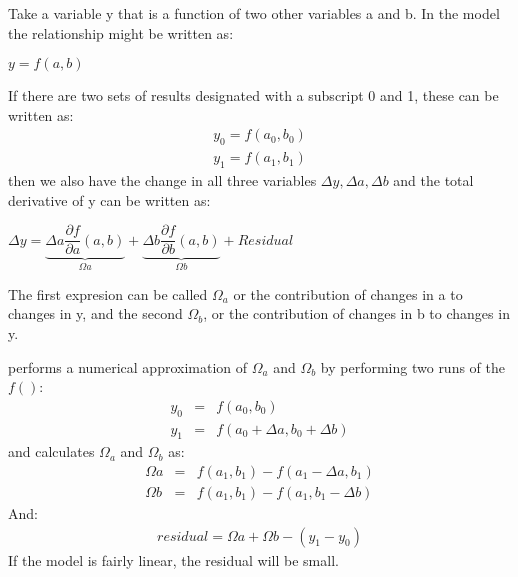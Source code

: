 \documentclass[letterpaper,10pt,english]{jupyterBook}
\begin{document}
\sphinxAtStartPar
Take a variable y that is a function of two other variables a and b.  In the model the relationship might be written as:

\sphinxAtStartPar
\(y = f(a,b)\)

\sphinxAtStartPar
If there are two sets of results designated with a subscript 0 and 1, these can be written as:
\label{equation:content/06_ModelAnalytics/AttributionSomeFeatures:6b774984-3ffb-4b9a-85d9-ca7109aa07b8}\begin{eqnarray}
y_0 = f(a_0,b_0)\\
y_1 = f(a_1,b_1)
\end{eqnarray}
\sphinxAtStartPar
then we also have the change in all three variables \(\Delta y, \Delta a, \Delta b\) and the total derivative of y can be written as:

\sphinxAtStartPar
\(\Delta y = \underbrace{\Delta a \dfrac{\partial {f}}{\partial{a}}(a,b)}_{\Omega a} + 
\underbrace{\Delta b \dfrac{\partial {f}}{\partial{b}}(a,b)}_{\Omega b}+Residual\)

\sphinxAtStartPar
The first expresion can be called \(\Omega_a\) or the contribution of changes in a to changes in y, and the second \(\Omega_b\),  or the contribution of changes in b to changes in y.

\sphinxAtStartPar
{} performs a numerical approximation of \(\Omega_a\) and \(\Omega_b\) by performing two runs of the \(f()\):
\label{equation:content/06_ModelAnalytics/AttributionSomeFeatures:b45ef03c-1918-452a-bdac-9fba5088a072}\begin{eqnarray}  
y_0&=&f(a_{0},b_{0}) \\
y_1&=&f(a_0+\Delta a,b_{0}+ \Delta b)
\end{eqnarray}
\sphinxAtStartPar
and calculates \(\Omega_a\) and \(\Omega_b\) as:
\label{equation:content/06_ModelAnalytics/AttributionSomeFeatures:0b70351f-5a4e-46af-aab3-ca6802e9eab7}\begin{eqnarray}  
\Omega a&=&f(a_1,b_1 )-f(a_1-\Delta a,b_1) \\
\Omega b&=&f(a_1,b_1 )-f(a_1,b_1-\Delta  b)
\end{eqnarray}
\sphinxAtStartPar
And:
\label{equation:content/06_ModelAnalytics/AttributionSomeFeatures:9e31a31e-cb3b-456d-ba68-0b86e11ddeb6}\begin{eqnarray}
residual = \Omega a + \Omega b -(y_1 - y_0) 
\end{eqnarray}
\sphinxAtStartPar
If the model is fairly linear, the residual will be small.
\end{document}
